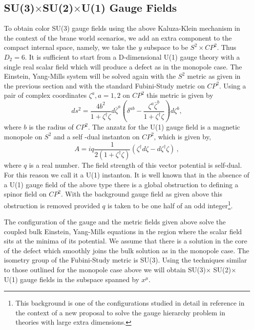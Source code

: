 \documentclass[a4paper,12pt]{article}
\begin{document}
\subsection{SU(3)$\times$SU(2)$\times$U(1) Gauge Fields}
To obtain color SU(3) gauge fields using the above Kaluza-Klein
mechanism in the context of the brane world scenarios, we add an
extra component to the compact internal space, namely, we take the
$y$ subspace to be  $S^2\times CP^2$. Thus $D_2=6$. It is sufficient
to start from a D-dimensional U(1) gauge theory with a single real
scalar  field which will produce a defect as in the monopole case.
The Einstein, Yang-Mills system will be solved again with the $S^2$
metric as given in the previous section and with the standard
Fubini-Study metric on $CP^2$. Using a pair of complex coordinates
$\zeta^a, a=1,2$ on $CP^2$ this metric is given by
\begin{equation}
 ds^2= \frac{4b^2}{1+\zeta^{\dag}\zeta}
d{\bar \zeta}^a \left(\delta^{ab}-
\frac{\zeta^a{\bar\zeta}^b}{1+\zeta^{\dag} \zeta}
\right)d\zeta^b,
\end{equation}
where $b$ is the radius of $CP^2$. The anzatz for the U(1) gauge
field is a magnetic monopole on $S^2$ and a self -dual instanton on
$CP^2$, which is given by,
\begin{equation}
 A= iq \frac{1}{2\left(1+\zeta^{\dag}
\zeta\right)}\left(\zeta^\dag d\zeta - d\zeta^\dag \zeta
\right)~,
\label{a}
\end{equation}
where $q$ is a real number. The field strength of this vector
potential is self-dual. For this reason we call it a U(1) instanton.
It is well known that in the absence of a U(1) gauge field of the
above type there is a global obstruction to defining a spinor field
on $CP^2$. With the background gauge field as given above this
obstruction is removed provided $q$ is taken to be one half of an odd
integer\footnote{This background is one of the configurations studied
in detail in reference \cite{Dvali:2001qr} in the context of a  new
proposal to solve the gauge hierarchy problem in theories with large
extra dimensions.}.

The configuration of the gauge and the metric fields given above
solve the coupled bulk Einstein, Yang-Mills equations in the region
where the scalar field sits at the minima of its potential.  We
assume that there is a solution in the core of the defect which
smoothly joins the bulk solution as in the monopole case. The
isometry group of the Fubini-Study metric is SU(3). Using the
techniques similar to those outlined for the monopole case above we
will obtain SU(3)$\times$ SU(2)$\times$ U(1) gauge fields in the
subspace spanned by $x^\mu$.
\end{document}
